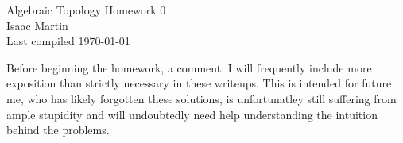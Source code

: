 

\def\sset{\subseteq}
\def\iso{\cong}
\def\gend#1{\langle #1\rangle}


\pagestyle{empty}
	\LARGE
\begin{center}
	Algebraic Topology Homework 0 \\
	\Large
	Isaac Martin \\
    Last compiled \today
\end{center}
\normalsize
\vspace{-2mm}
\hru

Before beginning the homework, a comment: I will frequently include more exposition than strictly necessary in these writeups. This is intended for future me, who has likely forgotten these solutions, is unfortunatley still suffering from ample stupidity and will undoubtedly need help understanding the intuition behind the problems.

